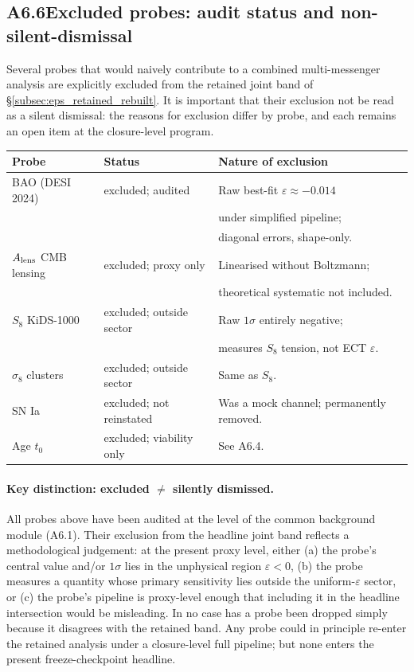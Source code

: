 \subsection*{A6.6\quad Excluded probes: audit status and
non-silent-dismissal}

Several probes that would naively contribute to a combined
multi-messenger analysis are explicitly excluded from the
retained joint band of \S\ref{subsec:eps_retained_rebuilt}. It
is important that their exclusion not be read as a silent
dismissal: the reasons for exclusion differ by probe, and each
remains an open item at the closure-level program.
\begin{center}
\begin{tabular}{|l|l|l|}
\hline
Probe & Status & Nature of exclusion \\
\hline
BAO (DESI 2024) & excluded; audited & Raw best-fit
$\varepsilon \approx -0.014$ \\
& & under simplified pipeline; \\
& & diagonal errors, shape-only. \\
\hline
$A_{\rm lens}$ CMB lensing & excluded; proxy only & Linearised
without Boltzmann; \\
& & theoretical systematic not included. \\
\hline
$S_8$ KiDS-1000 & excluded; outside sector & Raw $1\sigma$
entirely negative; \\
& & measures $S_8$ tension, not ECT $\varepsilon$. \\
\hline
$\sigma_8$ clusters & excluded; outside sector & Same as $S_8$. \\
\hline
SN Ia & excluded; not reinstated & Was a mock channel; permanently
removed. \\
\hline
Age $t_0$ & excluded; viability only & See A6.4. \\
\hline
\end{tabular}
\end{center}

\paragraph{Key distinction: excluded $\neq$ silently dismissed.}
All probes above have been audited at the level of the common
background module (A6.1). Their exclusion from the headline joint
band reflects a methodological judgement: at the present proxy
level, either (a) the probe's central value and/or $1\sigma$
lies in the unphysical region $\varepsilon < 0$, (b) the probe
measures a quantity whose primary sensitivity lies outside the
uniform-$\varepsilon$ sector, or (c) the probe's pipeline is
proxy-level enough that including it in the headline intersection
would be misleading. In no case has a probe been dropped simply
because it disagrees with the retained band. Any probe could in
principle re-enter the retained analysis under a closure-level
full pipeline; but none enters the present freeze-checkpoint
headline.

